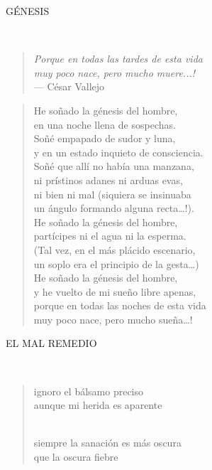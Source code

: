 \documentclass[a4paper, 12pt]{article}
\begin{document}
\pagebreak 
\centerline{GÉNESIS}
~ 
\begin{quote}
    
    \hspace*{\fill}\textit{ Porque en todas las tardes de esta vida\\ \hspace*{\fill}muy poco nace, pero mucho muere...!}\\
\hspace*{\fill}— César Vallejo

\end{quote}

\begin{verse}

He soñado la génesis del hombre,\\
en una noche llena de sospechas.\\
Soñé empapado de sudor y luna,\\
y en un estado inquieto de consciencia.\\
Soñé que allí no había una manzana,\\
ni prístinos adanes ni arduas evas,\\
ni bien ni mal (siquiera se insinuaba\\
un ángulo formando alguna recta…!).\\
He soñado la génesis del hombre,\\
partícipes ni el agua ni la esperma.\\
(Tal vez, en el más plácido escenario,\\
un soplo era el principio de la gesta…)\\
He soñado la génesis del hombre,\\
y he vuelto de mi sueño libre apenas,\\
porque en todas las noches de esta vida\\
muy poco nace, pero mucho sueña…!\\

\end{verse}

\pagebreak
\centerline{EL MAL REMEDIO}
~ 

\begin{verse}
    
ignoro el bálsamo preciso\\
aunque mi herida es aparente\\
~ 

siempre la sanación es más oscura\\
que la oscura fiebre\\
\end{verse}
\end{document}
